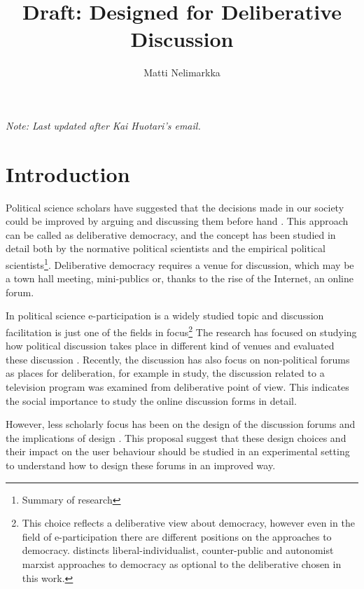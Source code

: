 \documentclass[journal,a4paper]{IEEEtran}
\author{Matti Nelimarkka}
\title{Draft: Designed for Deliberative Discussion}
\begin{document}
\maketitle

\setlength{\parindent}{0pt}
\setlength{\parskip}{1ex}

\textit{Note: Last updated after Kai Huotari's email.}

\section{Introduction}

Political science scholars have suggested that the decisions made in our society could be improved by arguing and discussing them before hand \cite{xxx}. This approach can be called as deliberative democracy, and the concept has been studied in detail both by the normative political scientists and the empirical political scientists\footnote{Summary of research}. Deliberative democracy requires a venue for discussion, which may be a town hall meeting, mini-publics or, thanks to the rise of the Internet, an online forum.

In political science e-participation is a widely studied topic and discussion facilitation is just one of the fields in focus\footnote{This choice reflects a deliberative view about democracy, however even in the field of e-participation there are different positions on the approaches to democracy.  distincts liberal-individualist, counter-public and autonomist marxist approaches to democracy as optional to the deliberative chosen in this work.} The research has focused on studying how political discussion takes place in different kind of venues  and evaluated these discussion . Recently, the discussion has also focus on non-political forums as places for deliberation, for example in  study, the discussion related to a television program was examined from deliberative point of view. This indicates the social importance to study the online discussion forms in detail.

However, less scholarly focus has been on the design of the discussion forums and the implications of design . This proposal suggest that these design choices and their impact on the user behaviour should be studied in an experimental setting to understand how to design these forums in an improved way.
\end{document}
